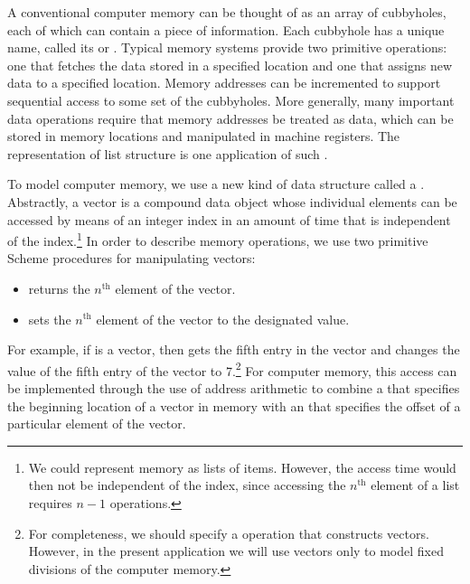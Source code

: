 A conventional computer memory can be thought of as an array of cubbyholes,
each of which can contain a piece of information.  Each cubbyhole has a unique
name, called its  or .  Typical memory
systems provide two primitive operations: one that fetches the data stored in a
specified location and one that assigns new data to a specified location.
Memory addresses can be incremented to support sequential access to some set of
the cubbyholes.  More generally, many important data operations require that
memory addresses be treated as data, which can be stored in memory locations
and manipulated in machine registers.  The representation of list structure is
one application of such .

To model computer memory, we use a new kind of data structure called a
.  Abstractly, a vector is a compound data object whose
individual elements can be accessed by means of an integer index in an amount
of time that is independent of the index.\footnote{We could represent memory as
lists of items.  However, the access time would then not be independent of the
index, since accessing the \( n^{\mathrm{th}} \) element of a list requires \( n - 1 \)
 operations.} In order to describe memory operations, we use two
primitive Scheme procedures for manipulating vectors:

\begin{itemize}
\item
{} returns the \( n^{\mathrm{th}} \)
element of the vector.

\item
{}
sets the \( n^{\mathrm{th}} \) element of the vector to the designated value.
\end{itemize}

\noindent
For example, if  is a vector, then  gets the
fifth entry in the vector  and  changes the
value of the fifth entry of the vector  to 7.\footnote{For
completeness, we should specify a  operation that constructs
vectors.  However, in the present application we will use vectors only to model
fixed divisions of the computer memory.}  For computer memory, this access can
be implemented through the use of address arithmetic to combine a  that specifies the beginning location of a vector in memory with an
 that specifies the offset of a particular element of the
vector.

